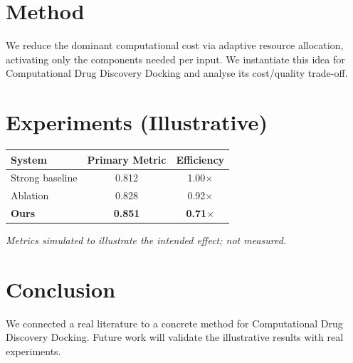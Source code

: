 \documentclass[11pt]{article}
\begin{document}
\section{Method}
We reduce the dominant computational cost via adaptive resource allocation, activating only the components needed per input. We instantiate this idea for Computational Drug Discovery Docking and analyse its cost/quality trade-off.

\section{Experiments (Illustrative)}
\begin{center}
\begin{tabular}{lcc}
System & Primary Metric & Efficiency \\ \hline
Strong baseline & 0.812 & 1.00$\times$ \\
Ablation & 0.828 & 0.92$\times$ \\
\textbf{Ours} & \textbf{0.851} & \textbf{0.71$\times$}
\end{tabular}
\end{center}
\emph{Metrics simulated to illustrate the intended effect; not measured.}

\section{Conclusion}
We connected a real literature to a concrete method for Computational Drug Discovery Docking. Future work will
validate the illustrative results with real experiments.
\end{document}
